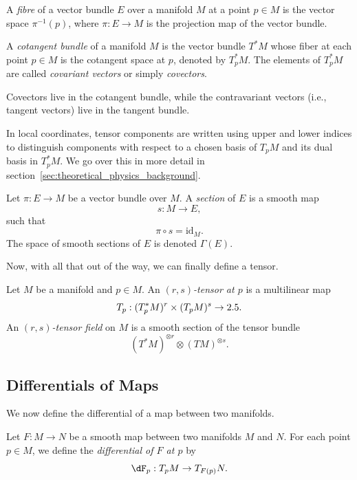 \begin{definition}
  A \emph{fibre} of a vector bundle $E$ over a manifold $M$ at a point $p \in M$ is the vector space $\pi^{-1}(p)$, where $\pi : E \to M$ is the projection map of the vector bundle.
\end{definition}

\begin{definition}
  A \emph{cotangent bundle} of a manifold $M$ is the vector bundle $T^*M$ whose fiber at each point $p \in M$ is the cotangent space at $p$, denoted by $T_p^*M$. The elements of $T_p^*M$ are called \emph{covariant vectors} or simply \emph{covectors}.
\end{definition}

\begin{note}
  Covectors live in the cotangent bundle, while the contravariant vectors (i.e., tangent vectors) live in the tangent bundle.
\end{note}

In local coordinates, tensor components are written using upper and lower indices to distinguish components with respect to a chosen basis of $T_pM$ and its dual basis in $T_p^*M$. We go over this in more detail in section~\ref{sec:theoretical_physics_background}.

\begin{definition}
  Let $\pi : E \to M$ be a vector bundle over $M$. A \emph{section} of $E$ is a smooth map
  \[%
    s : M \to E
  ,\]%
  such that
  \[%
    \pi \circ s = \mathrm{id}_M
  .\]%
  The space of smooth sections of $E$ is denoted $\Gamma(E)$.
\end{definition}



Now, with all that out of the way, we can finally define a tensor.

\begin{definition}
  Let $M$ be a manifold and $p \in M$. An \emph{$(r,s)$-tensor at $p$} is a multilinear map
  \[%
    T_p : (T_p^*M)^r \times (T_pM)^s \to \R
  .\]%
  An \emph{$(r,s)$-tensor field} on $M$ is a smooth section of the tensor bundle
  \[%
    (T^*M)^{\otimes r} \otimes (TM)^{\otimes s}
  .\]%
\end{definition}

\subsection{Differentials of Maps} We now define the differential of a map between two manifolds.
\begin{definition}
  Let $F : M \to N$ be a smooth map between two manifolds $M$ and $N$. For each point $p \in M$, we define the \emph{differential of $F$ at $p$} by
  \[%
    \dF_p : T_pM \to T_{F(p)}N
  .\]%
\end{definition}

